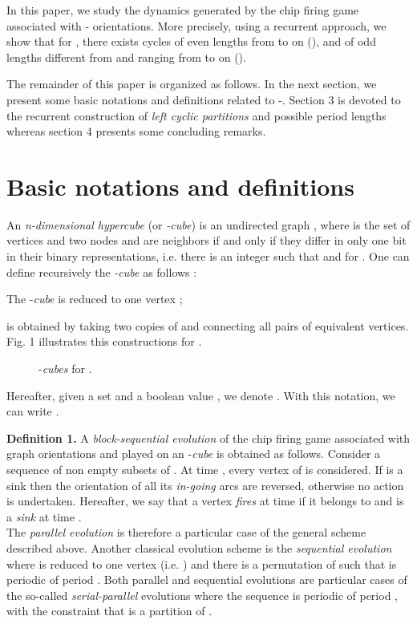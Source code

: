 \documentclass{article}
\begin{document}
In this paper, we study the dynamics generated by the chip firing game
associated with - orientations. More precisely, using a
recurrent approach, we show that for , there exists cycles of even lengths from
  to  on  (), and of odd lengths different from  and ranging from  to
  on  ().

The remainder of this paper is organized as follows. In the next section, we
present some basic notations and definitions related to -. Section 3 is devoted to the recurrent
 construction of {\em left cyclic partitions} and possible period lengths whereas section 4 presents some concluding remarks.

\section{Basic notations and definitions}
An {\em n-dimensional hypercube} (or {\em -cube}) is an undirected graph
, where  is the set of vertices and two nodes
 and  are neighbors if and
only if they differ in only one bit in their binary representations, i.e.
there is an integer  such that  and  for . One can define recursively the {\em -cube} as follows :

 The -{\em cube} is reduced to one vertex ;

  is obtained by taking two copies of  and connecting
all pairs of equivalent vertices.\\
Fig. 1 illustrates this constructions for .
\begin{figure}[htbp]
\centering
\epsfxsize=8.6cm
\caption{\label{figgraph} -{\em cubes} for .}
\end{figure}

Hereafter, given a set  and a boolean value , we denote . With this notation, we can write .

{\bf Definition 1.} A {\em block-sequential evolution} of the chip firing game
associated with graph orientations and played on an -{\em cube} is
obtained as follows. Consider a sequence of non empty subsets  of . At time , every vertex  of  is
considered. If  is a sink then the orientation of all its {\em in-going}
arcs are reversed, otherwise no action is undertaken. Hereafter, we say that a vertex {\em fires} at time 
if it belongs to  and is a {\em sink} at time .\vspace{2mm} \\

The {\em parallel evolution} is therefore a particular case of the general
scheme described above. Another classical evolution scheme is the {\em
  sequential evolution} where  is reduced to one vertex (i.e. )
and there is a permutation  of  such that  is periodic of period . Both parallel and sequential evolutions are particular cases of the
so-called {\em serial-parallel} evolutions where the sequence  is periodic of period , with the constraint that
   is a partition of .\vspace{2mm}\\
\end{document}
